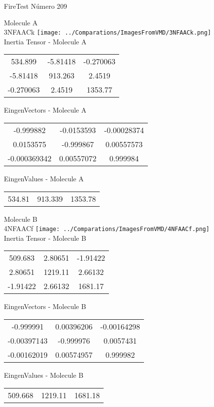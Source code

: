\vtab[-2cm]
\begin{center}
{\large FireTest \tab Número 209}
\end{center}
\begin{multicols}{2}
\begin{center}

Molecule A \\ 
3NFAACk
\texttt{[image: ../Comparations/ImagesFromVMD/3NFAACk.png]}
\\
Inertia Tensor - Molecule A \\
\vtab

\begin{tabular}{|c c c|}
534.899	 & 	-5.81418	 & 	-0.270063	 \\
-5.81418	 & 	913.263	 & 	2.4519	 \\
-0.270063	 & 	2.4519	 & 	1353.77
\end{tabular}

\vtab
 EingenVectors - Molecule A     \\
\vtab
\begin{tabular}{|c c c|}
-0.999882	 & 	-0.0153593	 & 	-0.00028374	 \\
0.0153575	 & 	-0.999867	 & 	0.00557573	 \\
-0.000369342	 & 	0.00557072	 & 	0.999984
\end{tabular}

\vtab
 EingenValues - Molecule A     \\
\vtab
\begin{tabular}{|c c c|}
534.81	 & 	913.339	 & 	1353.78	 \\
\end{tabular}
\columnbreak

Molecule B \\ 
4NFAACf
\texttt{[image: ../Comparations/ImagesFromVMD/4NFAACf.png]}
\\
Inertia Tensor - Molecule B \\
\vtab

\begin{tabular}{|c c c|}
509.683	 & 	2.80651	 & 	-1.91422	 \\
2.80651	 & 	1219.11	 & 	2.66132	 \\
-1.91422	 & 	2.66132	 & 	1681.17
\end{tabular}

\vtab
 EingenVectors - Molecule B     \\
\vtab
\begin{tabular}{|c c c|}
-0.999991	 & 	0.00396206	 & 	-0.00164298	 \\
-0.00397143	 & 	-0.999976	 & 	0.0057431	 \\
-0.00162019	 & 	0.00574957	 & 	0.999982
\end{tabular}

\vtab
 EingenValues - Molecule B     \\
\vtab
\begin{tabular}{|c c c|}
509.668	 & 	1219.11	 & 	1681.18	 \\
\end{tabular}

\end{center}
\end{multicols}
